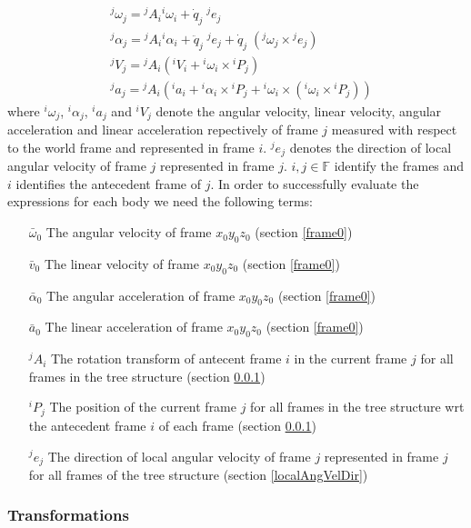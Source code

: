 \documentclass[a4paper,10pt]{article}
\begin{document}
\begin{align}
 &{}^j\omega_j={}^jA_i{}^i\omega_i+\dot{q}_j\;{}^je_j \label{recursiveAngVel}\\
 &{}^j\alpha_j={}^jA_i{}^i\alpha_i+\ddot{q}_j\;{}^je_j+\dot{q}_j\;({}^j\omega_j \times {}^je_j) \label{recursiveAngAcc}\\
 &{}^jV_j={}^jA_i\left({}^iV_i+{}^i\omega_i \times {}^iP_j\right) \label{recursiveLinVel}\\
 &{}^ja_j={}^jA_i\left({}^ia_i+{}^i\alpha_i \times {}^iP_j + {}^i\omega_i \times ({}^i\omega_i \times {}^iP_j)\right) \label{recursiveLinAcc}
\end{align} where ${}^i\omega_j$, ${}^i\alpha_j$, ${}^ia_j$ and ${}^iV_j$ denote the angular velocity, linear velocity, 
angular acceleration and linear acceleration repectively of frame $j$ measured with respect to the 
world frame and represented in frame $i$. ${}^je_j$ denotes the direction of local angular velocity of frame $j$ represented in frame $j$. 
$i, j \in \mathbb{F}$ identify the frames and $i$ identifies the antecedent frame of $j$. In order to successfully evaluate the expressions for each body we need the following terms:
\begin{itemize}[label={}]
 \item[$\bar\omega_0$] The angular velocity of frame $x_0y_0z_0$ (section \ref{frame0})
 \item[$\bar{v}_0$] The linear velocity of frame $x_0y_0z_0$ (section \ref{frame0})
 \item[$\bar\alpha_0$] The angular acceleration of frame $x_0y_0z_0$ (section \ref{frame0})
 \item[$\bar{a}_0$] The linear acceleration of frame $x_0y_0z_0$ (section \ref{frame0})
 \item[${}^jA_i$] The rotation transform of antecent frame $i$ in the current frame $j$ for all frames in the tree structure (section \ref{tf})
 \item[${}^iP_j$] The position of the current frame $j$ for all frames in the tree structure wrt the antecedent frame $i$ of each frame (section \ref{tf})
 \item[${}^je_j$] The direction of local angular velocity of frame $j$ represented in frame $j$ for all frames of  the tree structure (section \ref{localAngVelDir})
\end{itemize}

\subsubsection{Transformations} \label{tf}
\end{document}
